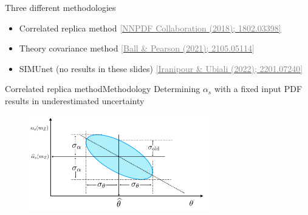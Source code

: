 \documentclass[aspectratio=169, 8pt,t]{beamer}
\begin{document}
\begin{frame}{Three different methodologies}
  \begin{itemize}
    \item Correlated replica method \href{https://arxiv.org/abs/1802.03398}{\textcolor{gray}{[NNPDF Collaboration (2018); 1802.03398]}}
    \item Theory covariance method \href{https://arxiv.org/abs/2105.05114}{\textcolor{gray}{[Ball \& Pearson (2021); 2105.05114]}}
    \item SIMUnet (no results in these slides) \href{https://arxiv.org/abs/2201.07240}{\textcolor{gray}{[Iranipour \& Ubiali (2022); 2201.07240]}}
  \end{itemize}
\end{frame}


\begin{frame}{Correlated replica method}{Methodology}
  Determining $\alpha_s$ with a fixed input PDF results in underestimated uncertainty
  \begin{figure}
    \centering
    \includegraphics[width=0.7\textwidth]{figures/alphaspdfcorplot.png}
  \end{figure}
\end{frame}
\end{document}
